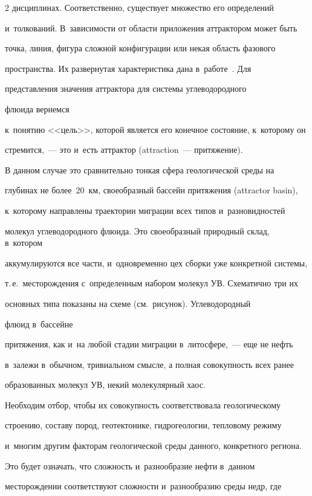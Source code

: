 \begin{multicols}{2}
дисциплинах. Соответственно, существует множество его определений 

и~толкований. В~зависимости от области приложения аттрактором может быть 

точка, линия, фигура сложной конфигурации или некая область фазового 

пространства. Их развернутая характеристика дана в~работе~\cite{13-s}. Для 

представления значения аттрактора для сис\-те\-мы углеводородного

флю\-ида вернемся 

к~понятию <<цель>>, которой является его конечное состояние, к~которому он 

стремится,~--- это и~есть аттрактор (attraction~--- притяжение). 

    

    В данном случае это сравнительно тонкая сфера геологической среды на 

глубинах не более~20~км, своеобразный бассейн притяжения (attractor basin), 

к~которому направлены траектории миграции всех типов и~разновидностей 

молекул углеводородного флю\-ида. Это своеобразный природный склад, в~котором 

аккумулируются все час\-ти, и~одновременно цех сборки уже конкретной сис\-те\-мы, 

т.\,е.\ месторождения с~определенным набором молекул УВ. Схематично три их 

основных типа показаны на схеме (см.\ рисунок). Углеводородный

флю\-ид в~бассейне 

притяжения, как и~на любой стадии миграции в~литосфере,~--- еще не нефть 

в~залежи в~обычном, тривиальном смысле, а полная совокупность всех ранее 

образованных мо\-ле\-кул УВ, некий молекулярный хаос. 

    

    Необходим отбор, чтобы их совокупность соответствовала геологическому 

строению, составу пород, геотектонике, гидрогеологии, тепловому режиму 

и~многим другим факторам геологической среды данного, конкретного региона. 

Это будет означать, что сложность и~разнообразие нефти в~данном 

месторождении соответствуют слож\-ности и~разнообразию среды недр, где 


\end{multicols}
